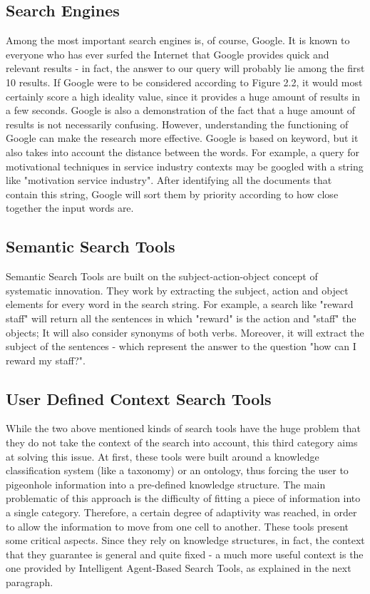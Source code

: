 \subsection{Search Engines}
Among the most important search engines is, of course, Google. It is known to everyone who has ever surfed the Internet that Google provides quick and relevant results - in fact, the answer to our query will probably lie among the first 10 results. If Google were to be considered according to Figure 2.2, it would most certainly score a high ideality value, since it provides a huge amount of results in a few seconds. Google is also a demonstration of the fact that a huge amount of results is not necessarily confusing. However, understanding the functioning of Google can make the research more effective. Google is based on keyword, but it also takes into account the distance between the words. For example, a query for motivational techniques in service industry contexts may be googled with a string like "motivation service industry". After identifying all the documents that contain this string, Google will sort them by priority according to how close together the input words are.
\subsection{Semantic Search Tools}
Semantic Search Tools are built on the subject-action-object concept of systematic innovation. They work by extracting the subject, action and object elements for every word in the search string. For example, a search like "reward staff" will return all the sentences in which "reward" is the action and "staff" the objects; It will also consider synonyms of both verbs. Moreover, it will extract the subject of the sentences - which represent the answer to the question "how can I reward my staff?".
\subsection{User Defined Context Search Tools}
While the two above mentioned kinds of search tools have the huge problem that they do not take the context of the search into account, this third category aims at solving this issue. At first, these tools were built around a knowledge classification system (like a taxonomy) or an ontology, thus forcing the user to pigeonhole information into a pre-defined knowledge structure. The main problematic of this approach is the difficulty of fitting a piece of information into a single category. Therefore, a certain degree of adaptivity was reached, in order to allow the information to move from one cell to another. These tools present some critical aspects. Since they rely on knowledge structures, in fact, the context that they guarantee is general and quite fixed - a much more useful context is the one provided by Intelligent Agent-Based Search Tools, as explained in the next paragraph.
